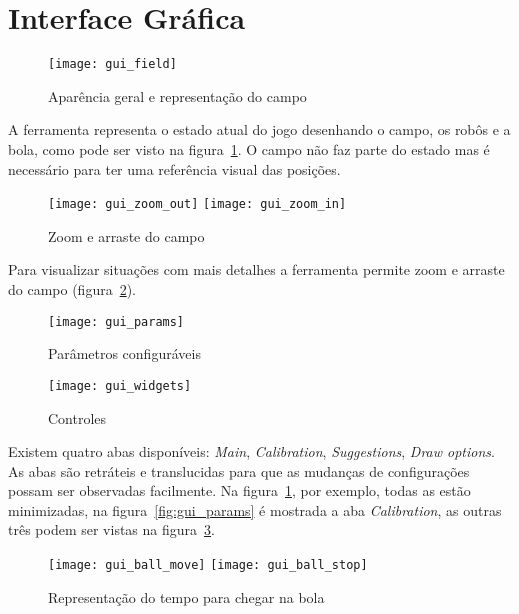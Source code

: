 \section{Interface Gráfica}\label{sec:gui}

\FloatBarrier

\begin{figure}[h]
  \centering
  \texttt{[image: gui\_field]}
  \caption{Aparência geral e representação do campo}\label{fig:gui_field}
\end{figure}

A ferramenta representa o estado atual do jogo desenhando o campo, os robôs e a
bola, como pode ser visto na figura~\ref{fig:gui_field}.  O campo não faz parte
do estado mas é necessário para ter uma referência visual das posições.

\begin{figure}[h]
  \centering
  \texttt{[image: gui\_zoom\_out]}
  \texttt{[image: gui\_zoom\_in]}
  \caption{Zoom e arraste do campo}\label{fig:gui_zoom}
\end{figure}

Para visualizar situações com mais detalhes a ferramenta permite zoom e arraste
do campo (figura~\ref{fig:gui_zoom}).

\FloatBarrier

\begin{figure}[h]
  \centering
  \texttt{[image: gui\_params]}
  \caption{Parâmetros configuráveis}\label{fig:gui_params}
  \texttt{[image: gui\_widgets]}
  \caption{Controles}\label{fig:gui_widgets}
\end{figure}

\FloatBarrier

Existem quatro abas disponíveis: \textit{Main}, \textit{Calibration},
\textit{Suggestions}, \textit{Draw options}. As abas são retráteis e
translucidas para que as mudanças de configurações possam ser observadas
facilmente.  Na figura~\ref{fig:gui_field}, por exemplo, todas as estão
minimizadas, na figura~\ref{fig:gui_params} é mostrada a aba
\textit{Calibration}, as outras três podem ser vistas na
figura~\ref{fig:gui_widgets}.

\begin{figure}[h]
  \centering
  \texttt{[image: gui\_ball\_move]}
  \texttt{[image: gui\_ball\_stop]}
  \caption{Representação do tempo para chegar na bola}\label{fig:gui_ball}
\end{figure}

